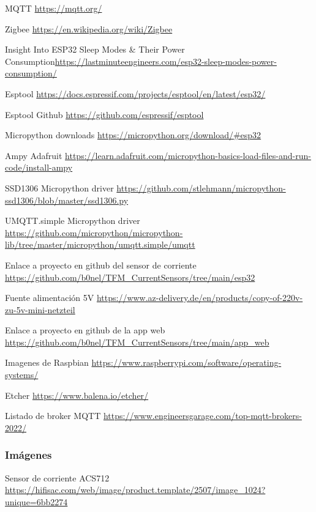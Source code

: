\begin{thebibliography}{9}
MQTT \url{https://mqtt.org/}

Zigbee \url{https://en.wikipedia.org/wiki/Zigbee}

Insight Into ESP32 Sleep Modes \& Their Power Consumption\url{https://lastminuteengineers.com/esp32-sleep-modes-power-consumption/}

Esptool \url{https://docs.espressif.com/projects/esptool/en/latest/esp32/}

Esptool Github \url{https://github.com/espressif/esptool}

Micropython downloads \url{https://micropython.org/download/#esp32}

Ampy Adafruit \url{https://learn.adafruit.com/micropython-basics-load-files-and-run-code/install-ampy}

SSD1306 Micropython driver \url{https://github.com/stlehmann/micropython-ssd1306/blob/master/ssd1306.py}

UMQTT.simple Micropython driver \url{https://github.com/micropython/micropython-lib/tree/master/micropython/umqtt.simple/umqtt}

Enlace a proyecto en github del sensor de corriente \url{https://github.com/b0nel/TFM_CurrentSensors/tree/main/esp32}

Fuente alimentación 5V \url{https://www.az-delivery.de/en/products/copy-of-220v-zu-5v-mini-netzteil}

Enlace a proyecto en github de la app web \url{https://github.com/b0nel/TFM_CurrentSensors/tree/main/app_web}

Imagenes de Raspbian \url{https://www.raspberrypi.com/software/operating-systems/}

Etcher \url{https://www.balena.io/etcher/}

Listado de broker MQTT \url{https://www.engineersgarage.com/top-mqtt-brokers-2022/}














\subsubsection{Imágenes}
Sensor de corriente ACS712 \url{https://hifisac.com/web/image/product.template/2507/image_1024?unique=6bb2274}


\end{thebibliography}
